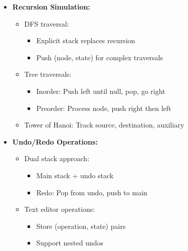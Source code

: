 \documentclass[a4paper,10pt]{book}
\begin{document}
\begin{itemize}
    \item \textbf{Recursion Simulation:}
    \begin{itemize}
        \item DFS traversal:
        \begin{itemize}
            \item Explicit stack replaces recursion
            \item Push (node, state) for complex traversals
        \end{itemize}
        \item Tree traversals:
        \begin{itemize}
            \item Inorder: Push left until null, pop, go right
            \item Preorder: Process node, push right then left
        \end{itemize}
        \item Tower of Hanoi: Track source, destination, auxiliary
    \end{itemize}
    
    \item \textbf{Undo/Redo Operations:}
    \begin{itemize}
        \item Dual stack approach:
        \begin{itemize}
            \item Main stack + undo stack
            \item Redo: Pop from undo, push to main
        \end{itemize}
        \item Text editor operations:
        \begin{itemize}
            \item Store (operation, state) pairs
            \item Support nested undos
        \end{itemize}
    \end{itemize}
    

\end{itemize}
\end{document}
